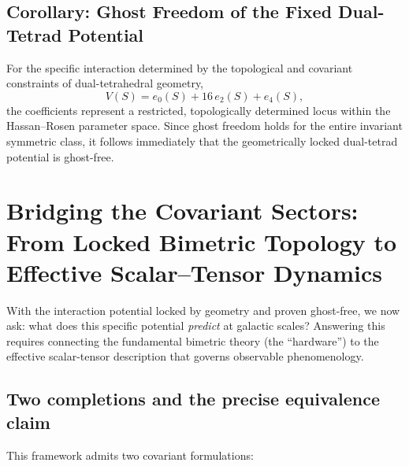 \documentclass[twocolumn]{iopjournal}
\begin{document}
\subsection*{Corollary: Ghost Freedom of the Fixed Dual-Tetrad Potential}
For the specific interaction determined by the topological and covariant constraints of dual-tetrahedral geometry,
\begin{equation}
V(S) = e_0(S) + 16\, e_2(S) + e_4(S),
\end{equation}
the coefficients represent a restricted, topologically determined locus within the Hassan--Rosen parameter space. Since ghost freedom holds for the entire invariant symmetric class, it follows immediately that the geometrically locked dual-tetrad potential is ghost-free.


\section*{Bridging the Covariant Sectors: From Locked Bimetric Topology to Effective Scalar--Tensor Dynamics}

With the interaction potential locked by geometry and proven ghost-free, we now ask: what does this specific potential \emph{predict} at galactic scales? Answering this requires connecting the fundamental bimetric theory (the ``hardware'') to the effective scalar-tensor description that governs observable phenomenology.

\subsection*{Two completions and the precise equivalence claim}
This framework admits two covariant formulations:
\end{document}
